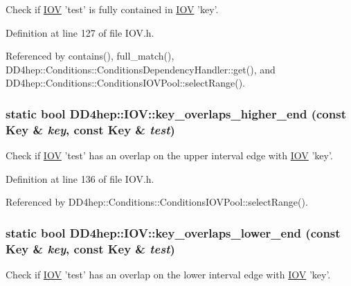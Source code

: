 Check if \hyperlink{class_d_d4hep_1_1_i_o_v}{IOV} 'test' is fully contained in \hyperlink{class_d_d4hep_1_1_i_o_v}{IOV} 'key'. 

Definition at line 127 of file IOV.h.

Referenced by contains(), full\_\-match(), DD4hep::Conditions::ConditionsDependencyHandler::get(), and DD4hep::Conditions::ConditionsIOVPool::selectRange().\hypertarget{class_d_d4hep_1_1_i_o_v_a2bbff41fece1d4692a155f997fb7aebf}{
\subsubsection[{key\_\-overlaps\_\-higher\_\-end}]{\setlength{\rightskip}{0pt plus 5cm}static bool DD4hep::IOV::key\_\-overlaps\_\-higher\_\-end (const {\bf Key} \& {\em key}, \/  const {\bf Key} \& {\em test})}}
\label{class_d_d4hep_1_1_i_o_v_a2bbff41fece1d4692a155f997fb7aebf}


Check if \hyperlink{class_d_d4hep_1_1_i_o_v}{IOV} 'test' has an overlap on the upper interval edge with \hyperlink{class_d_d4hep_1_1_i_o_v}{IOV} 'key'. 

Definition at line 136 of file IOV.h.

Referenced by DD4hep::Conditions::ConditionsIOVPool::selectRange().\hypertarget{class_d_d4hep_1_1_i_o_v_a6354b88d28e4e57bd50a02d9d4df7653}{
\subsubsection[{key\_\-overlaps\_\-lower\_\-end}]{\setlength{\rightskip}{0pt plus 5cm}static bool DD4hep::IOV::key\_\-overlaps\_\-lower\_\-end (const {\bf Key} \& {\em key}, \/  const {\bf Key} \& {\em test})}}
\label{class_d_d4hep_1_1_i_o_v_a6354b88d28e4e57bd50a02d9d4df7653}


Check if \hyperlink{class_d_d4hep_1_1_i_o_v}{IOV} 'test' has an overlap on the lower interval edge with \hyperlink{class_d_d4hep_1_1_i_o_v}{IOV} 'key'. 

